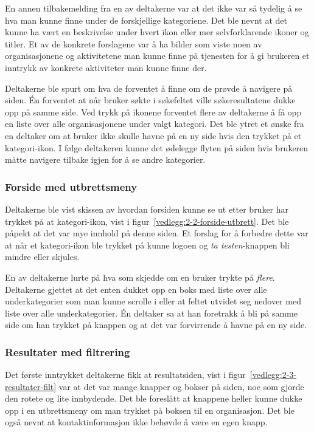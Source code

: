 En annen tilbakemelding fra en av deltakerne var at det ikke var så tydelig å se hva man kunne finne under de forskjellige kategoriene. Det ble nevnt at det kunne ha vært en beskrivelse under hvert ikon eller mer selvforklarende ikoner og titler. Et av de konkrete forslagene var å ha bilder som viste noen av organisasjonene og aktivitetene man kunne finne på tjenesten for å gi brukeren et inntrykk av konkrete aktiviteter man kunne finne der.

Deltakerne ble spurt om hva de forventet å finne om de prøvde å navigere på siden. Én forventet at når bruker søkte i søkefeltet ville søkeresultatene dukke opp på samme side. Ved trykk på ikonene forventet flere av deltakerne å få opp en liste over alle organisasjonene under valgt kategori. Det ble ytret et ønske fra en deltaker om at bruker ikke skulle havne på en ny side hvis den trykket på et kategori-ikon. I følge deltakeren kunne det ødelegge flyten på siden hvis brukeren måtte navigere tilbake igjen for å se andre kategorier.


\subsubsection{Forside med utbrettsmeny}

Deltakerne ble vist skissen av hvordan forsiden kunne se ut etter bruker har trykket på at kategori-ikon, vist i figur~\ref{vedlegg:2-2-forside-utbrett}. Det ble påpekt at det var mye innhold på denne siden. Et forslag for å forbedre dette var at når et kategori-ikon ble trykket på kunne logoen og {\em  ta testen}-knappen bli mindre eller skjules. 

En av deltakerne lurte på hva som skjedde om en bruker trykte på {\em  flere}. Deltakerne gjettet at det enten dukket opp en boks med liste over alle underkategorier som man kunne scrolle i eller at feltet utvidet seg nedover med liste over alle underkategorier. Én deltaker sa at han foretrakk å bli på samme side om han trykket på knappen og at det var forvirrende å havne på en ny side.


\subsubsection{Resultater med filtrering}
\label{section:test-resultater-2.0}

Det første inntrykket deltakerne fikk at resultatsiden, vist i figur~\ref{vedlegg:2-3-resultater-filt} var at det var mange knapper og bokser på siden, noe som gjorde den rotete og lite innbydende. Det ble foreslått at knappene heller kunne dukke opp i en utbrettsmeny om man trykket på boksen til en organisasjon. Det ble også nevnt at kontaktinformasjon ikke behøvde å være en egen knapp.

